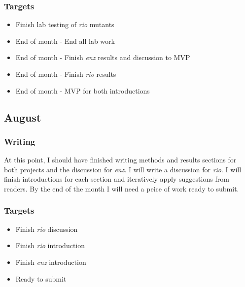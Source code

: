 \documentclass{article}
\begin{document}
\subsubsection{Targets}
\begin{itemize}
\item Finish lab testing of \textit{rio} mutants
\item End of month - End all lab work
\item End of month - Finish \textit{enz} results and discussion to MVP
\item End of month - Finish \textit{rio} results
\item End of month - MVP for both introductions
\end{itemize}

\subsection{August}
\subsubsection{Writing}
At this point, I should have finished writing methods and results sections for both projects and the discussion for \textit{enz}. %
I will write a discussion for \textit{rio}. %
I will finish introductions for each section and iteratively apply suggestions from readers. %
By the end of the month I will need a peice of work ready to submit. %
\subsubsection{Targets}
\begin{itemize}
\item Finish \textit{rio} discussion
\item Finish \textit{rio} introduction
\item Finish \textit{enz} introduction
\item Ready to submit
\end{itemize}


\end{document}
